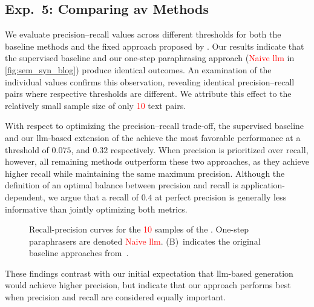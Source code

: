 \subsection{Exp.\ 5: Comparing \acs{av} Methods}%
\label{subsec:imp_gen_res}

We evaluate precision–recall values across different thresholds for both the baseline methods and the fixed approach proposed by \citet{koppel_determining_2014}.
Our results indicate that the supervised baseline and our one-step paraphrasing approach (\textcolor{red}{Naive \ac{llm}} in \autoref{fig:sem_syn_blog}) produce identical outcomes.
An examination of the individual values confirms this observation, revealing identical precision–recall pairs where respective thresholds are different.
We attribute this effect to the relatively small sample size of only \textcolor{red}{10} text pairs.

With respect to optimizing the precision–recall trade-off, the supervised baseline and our \ac{llm}-based extension of the \impAppr{} achieve the most favorable performance at a threshold of $0.075$, and $0.32$ respectively.
When precision is prioritized over recall, however, all remaining methods outperform these two approaches, as they achieve higher recall while maintaining the same maximum precision.
Although the definition of an optimal balance between precision and recall is application-dependent, we argue that a recall of $0.4$ at perfect precision is generally less informative than jointly optimizing both metrics.

\begin{figure}[htbp]
    \centering
    
    \caption[Recall-precision curves for the \dataStudent{}.]{Recall-precision curves for the \textcolor{red}{10} samples of the \dataStudent{}. 
    One-step paraphrasers are denoted \textcolor{red}{Naive \ac{llm}}.
    (B)~indicates the original baseline approaches from~\citep{koppel_determining_2014}.
    }
    \label{fig:sem_syn_blog}
\end{figure}

These findings contrast with our initial expectation that \ac{llm}-based \imp{} generation would achieve higher precision, but indicate that our approach performs best when precision and recall are considered equally important.
